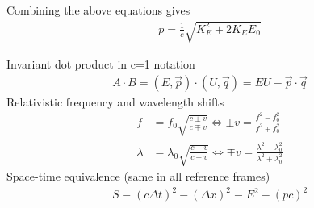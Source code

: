 \begin{multicols}{2}
Combining the above equations gives
\begin{align}
p=\frac{1}{c}\sqrt{K_E^2 + 2K_EE_0}
\end{align}

Invariant dot product in c=1 notation
\begin{align}
A \cdot B = (E, \vec{p}) \cdot (U, \vec{q}) = EU - \vec{p} \cdot \vec{q}
\end{align}
Relativistic frequency and wavelength shifts
\begin{align}
f &= f_0 \sqrt{\frac{c \pm v}{c \mp v}} 
\Longleftrightarrow \pm v=\frac{f^2-f_0^2}{f^2+f_0^2}  \\
\lambda &= \lambda_0 \sqrt{\frac{c \mp v}{c \pm v}} 
\Longleftrightarrow \mp v =\frac{\lambda^2-\lambda_0^2}{\lambda^2+\lambda_0^2}
\end{align}
Space-time equivalence (same in all reference frames)
\begin{align}
S \equiv (c \Delta t)^2 - (\Delta x)^2 \equiv E^2-(pc)^2
\end{align}
\end{multicols}
